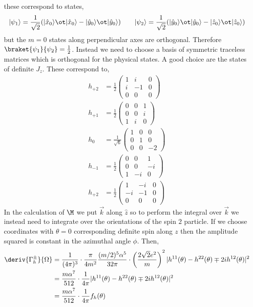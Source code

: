 \documentclass[12pt]{article}
\DeclarePairedDelimiter\ket{\lvert}{\rangle}
\begin{document}
these correspond to states,
\[ \ket{\psi_1} = \frac{1}{\sqrt{2}} (\ket{\hat{x}_0} \ot \ket{\hat{x}_0} - \ket{\hat{y}_0} \ot \ket{\hat{y}_0}) \quad \quad \ket{\psi_2} = \frac{1}{\sqrt{2}} (\ket{\hat{y}_0} \ot \ket{\hat{y}_0} - \ket{\hat{z}_0} \ot \ket{\hat{z}_0}) \]
but the $m = 0$ states along perpendicular axes are orthogonal. Therefore $\braket{\psi_1}{\psi_2} = \frac{1}{2}$. Instead we need to choose a basis of symmetric traceless matrices which is orthogonal for the physical states. A good choice are the states of definite $J_z$. These correspond to,
\begin{align*}
h_{+2} & = 
\frac{1}{2} \begin{pmatrix}
1 & i & 0
\\
i & -1 & 0
\\
0 & 0 & 0
\end{pmatrix}
\\
h_{+1} & = 
\frac{1}{2} \begin{pmatrix}
0 & 0 & 1
\\
0 & 0 & i
\\
1 & i & 0
\end{pmatrix}
\\
h_{0} & = 
\frac{1}{\sqrt{6}} \begin{pmatrix}
1 & 0 & 0
\\
0 & 1 & 0
\\
0 & 0 & -2
\end{pmatrix}
\\
h_{-1} & = 
\frac{1}{2} \begin{pmatrix}
0 & 0 & 1
\\
0 & 0 & -i
\\
1 & -i & 0
\end{pmatrix}
\\
h_{+2} & = 
\frac{1}{2} \begin{pmatrix}
1 & -i & 0
\\
-i & -1 & 0
\\
0 & 0 & 0
\end{pmatrix}
\end{align*}
In the calculation of $\M$ we put $\vec{k}$ along $\hat{z}$ so to perform the integral over $\vec{k}$ we instead need to integrate over the orientations of the spin $2$ particle. If we choose coordinates with $\theta = 0$ corresponding definite spin along $z$ then the amplitude squared is constant in the azimuthal angle $\phi$. Then,
\begin{align*}
\deriv{\Gamma_{h}^{\pm}}{\Omega} &= \frac{1}{(4 \pi)^3} \cdot \frac{\pi}{4m^2}  \frac{(m/2)^5 \alpha^5}{32 \pi}  \cdot \left( \frac{2 \sqrt{2} e^2}{m} \right)^2  |h^{11}(\theta) - h^{22}(\theta) \mp 2 i h^{12}(\theta)|^2
\\
& = \frac{m \alpha^7}{512} \cdot \frac{1}{4 \pi} |h^{11}(\theta) - h^{22}(\theta) \mp 2 i h^{12}(\theta)|^2 
\\
& = \frac{m \alpha^7}{512} \cdot \frac{1}{4 \pi} f_h(\theta)
\end{align*}
\end{document}
